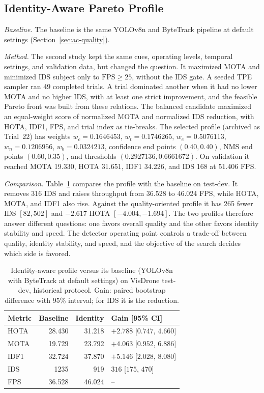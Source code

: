 \subsection{Identity-Aware Pareto Profile}\label{sec:ac-identity}
\emph{Baseline.} The baseline is the same YOLOv8n and ByteTrack pipeline at default settings (Section~\ref{sec:ac-quality}).

\emph{Method.} The second study kept the same cues, operating levels, temporal settings, and validation data, but changed the question. It maximized MOTA and minimized IDS subject only to $\mathrm{FPS}\geq25$, without the IDS gate. A seeded TPE sampler ran 49 completed trials. A trial dominated another when it had no lower MOTA and no higher IDS, with at least one strict improvement, and the feasible Pareto front was built from these relations. The balanced candidate maximized an equal-weight score of normalized MOTA and normalized IDS reduction, with HOTA, IDF1, FPS, and trial index as tie-breaks. The selected profile (archived as Trial~22) has weights $w_c=0.1646453$, $w_t=0.1746265$, $w_e=0.5076113$, $w_n=0.1206956$, $w_b=0.0324213$, confidence end points $(0.40,0.40)$, NMS end points $(0.60,0.35)$, and thresholds $(0.2927136, 0.6661672)$. On validation it reached MOTA 19.330, HOTA 31.651, IDF1 34.226, and IDS 168 at 51.406 FPS.

\emph{Comparison.} Table~\ref{tab:ac-identity} compares the profile with the baseline on test-dev. It removes 316 IDS and raises throughput from 36.528 to 46.024 FPS, while HOTA, MOTA, and IDF1 also rise. Against the quality-oriented profile it has 265 fewer IDS $[82, 502]$ and $-2.617$ HOTA $[-4.004, -1.694]$. The two profiles therefore answer different questions: one favors overall quality and the other favors identity stability and speed. The detector operating point controls a trade-off between quality, identity stability, and speed, and the objective of the search decides which side is favored.

\begin{table}[tbp]
\centering
\caption{Identity-aware profile versus its baseline (YOLOv8n with ByteTrack at default settings) on VisDrone test-dev, historical protocol. Gain: paired bootstrap difference with 95\% interval; for IDS it is the reduction.}
\label{tab:ac-identity}
\begin{tabular}{lrrl}
\toprule
Metric & Baseline & Identity & Gain [95\% CI]\\
\midrule
HOTA & 28.430 & 31.218 & $+2.788$ [$0.747$, $4.660$]\\
MOTA & 19.729 & 23.792 & $+4.063$ [$0.952$, $6.886$]\\
IDF1 & 32.724 & 37.870 & $+5.146$ [$2.028$, $8.080$]\\
IDS & 1235 & 919 & $316$ [$175$, $470$]\\
FPS & 36.528 & 46.024 & --\\
\bottomrule
\end{tabular}
\end{table}

